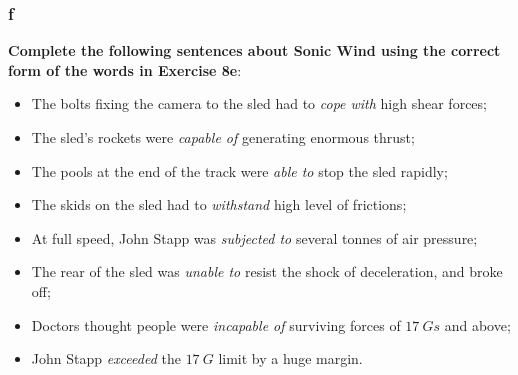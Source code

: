 \subsubsection{f}

\textbf{Complete the following sentences about Sonic Wind using the correct form of the words in Exercise 8e}:

\begin{itemize}

\item The bolts fixing the camera to the sled had to \textit{cope with} high shear forces;
\item The sled's rockets were \textit{capable of} generating enormous thrust;
\item The pools at the end of the track were \textit{able to} stop the sled rapidly;
\item The skids on the sled had to \textit{withstand} high level of frictions;
\item At full speed, John Stapp was \textit{subjected to} several tonnes of air pressure;
\item The rear of the sled was \textit{unable to} resist the shock of deceleration, and broke off;
\item Doctors thought people were \textit{incapable of} surviving forces of $17\ Gs$ and above;
\item John Stapp \textit{exceeded} the $17\ G$ limit by a huge margin.

\end{itemize}